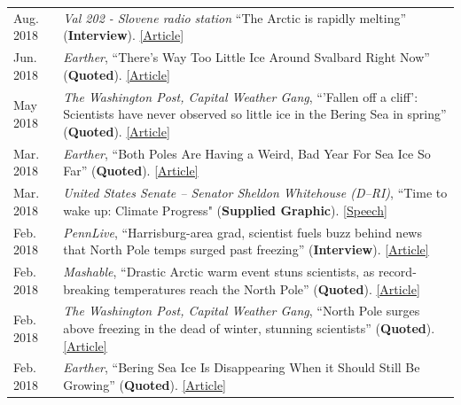 \documentclass[margin,line,palatino,courier,10pt]{res}
\begin{document}
\begin{resume}
\begin{tabular}{@{}p{0.9in}p{4in}}
Aug. 2018 & \textit{Val 202 - Slovene radio station} ``The Arctic is rapidly melting'' (\textbf{Interview}). \href{https://val202.rtvslo.si/2018/08/sonce-je-odprlo-zemljin-hladilnik/}{[Article]}\\
Jun. 2018 & \textit{Earther}, ``There's Way Too Little Ice Around Svalbard Right Now'' (\textbf{Quoted}). \href{https://earther.com/theres-way-too-little-ice-around-svalbard-right-now-1826567780}{[Article]}\\
May 2018 & \textit{The Washington Post, Capital Weather Gang}, ``'Fallen off a cliff': Scientists have never observed so little ice in the Bering Sea in spring'' (\textbf{Quoted}). \href{https://www.washingtonpost.com/news/capital-weather-gang/wp/2018/05/03/fallen-off-a-cliff-scientists-have-never-observed-so-little-ice-in-the-bering-sea-in-spring/?noredirect=on&utm_term=.cbcf2781b5e4}{[Article]}\\
Mar. 2018 & \textit{Earther}, ``Both Poles Are Having a Weird, Bad Year For Sea Ice So Far'' (\textbf{Quoted}). \href{https://earther.com/both-poles-are-having-a-weird-bad-year-for-sea-ice-so-1824074352}{[Article]}\\
Mar. 2018 & \textit{United States Senate -- Senator Sheldon Whitehouse (D--RI)}, ``Time to wake up: Climate Progress" (\textbf{Supplied Graphic}). \href{https://www.youtube.com/watch?v=C_E5OQgt2SE}{[Speech]}\\
Feb. 2018 & \textit{PennLive}, ``Harrisburg-area grad, scientist fuels buzz behind news that North Pole temps surged past freezing'' (\textbf{Interview}). \href{http://www.pennlive.com/news/2018/02/harrisburg-area_scientist_is_b.html}{[Article]}\\
Feb. 2018 & \textit{Mashable}, ``Drastic Arctic warm event stuns scientists, as record-breaking temperatures reach the North Pole'' (\textbf{Quoted}). \href{https://mashable.com/2018/02/26/arctic-heat-wave-north-pole-february-sea-ice/?utm_cid=hp-h-2#jZ.Ip1wPjkqD}{[Article]}\\
Feb. 2018 & \textit{The Washington Post, Capital Weather Gang}, ``North Pole surges above freezing in the dead of winter, stunning scientists'' (\textbf{Quoted}). \href{https://www.washingtonpost.com/news/capital-weather-gang/wp/2018/02/26/north-pole-surges-above-freezing-in-the-dead-of-winter-stunning-scientists/?utm_term=.6025384d6bf1}{[Article]}\\
Feb. 2018 & \textit{Earther}, ``Bering Sea Ice Is Disappearing When it Should Still Be Growing'' (\textbf{Quoted}). \href{https://earther.com/bering-sea-ice-is-disappearing-at-a-time-when-it-should-1823193914}{[Article]}\\

\end{tabular}
\end{resume}
\end{document}
